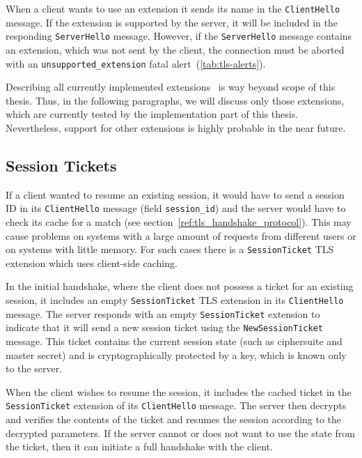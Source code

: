    When a client wants to use an extension
    it sends its name in the \texttt{ClientHello} message. If the
    extension is supported by the server, it will be included in the responding
    \texttt{ServerHello} message. However, if the \texttt{ServerHello} message
    contains an extension, which was not sent by the client, the connection
    must be aborted with an \texttt{unsupported\_extension} fatal
    alert~(\ref{tab:tls-alerts}).~\cite{rfc3546}~\cite{rfc4366}

    Describing all currently implemented extensions~\cite{rfc6066} is
    way beyond scope of this thesis.
    Thus, in the following paragraphs, we will discuss only those extensions,
    which are currently tested by the implementation part of this thesis.
    Nevertheless, support for other extensions is highly probable in
    the near future.

\subsection{Session Tickets}
    If a client wanted to resume an existing session, it would have to
    send a session ID in its \texttt{ClientHello} message (field \texttt{session\_id})
    and the server would have to check its cache for a match (see
    section~\ref{ref:tls_handshake_protocol}). This may cause problems on systems
    with a large amount of requests from different users or on systems with
    little memory. For such cases there is a \texttt{SessionTicket} TLS extension which uses
    client-side caching.~\cite{rfc5077}

    In the initial handshake, where the client does not possess a ticket for an existing
    session, it includes an empty \texttt{SessionTicket} TLS extension in
    its \texttt{ClientHello} message. The server responds with an empty
    \texttt{SessionTicket} extension to indicate that it will send a new session
    ticket using the \texttt{NewSessionTicket} message. This ticket contains
    the current session state (such as ciphersuite and master secret) and is
    cryptographically protected by a key, which is known only to the server.

    When the client wishes to resume the session, it includes the cached ticket
    in the \texttt{SessionTicket} extension of its \texttt{ClientHello} message.
    The server then decrypts and verifies the contents of the ticket and resumes
    the session according to the decrypted parameters. If the server cannot
    or does not want to use the state from the ticket, then it can initiate
    a full handshake with the client.

